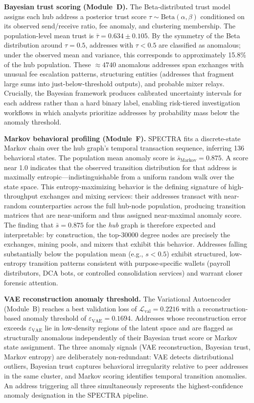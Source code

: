 \textbf{Bayesian trust scoring (Module~D).}
The Beta-distributed trust model assigns each hub address a posterior
trust score $\tau \sim \mathrm{Beta}(\alpha, \beta)$ conditioned on its
observed send/receive ratio, fee anomaly, and clustering membership.
The population-level mean trust is $\bar{\tau} = \num{0.634} \pm \num{0.105}$.
By the symmetry of the Beta distribution around $\tau = 0.5$, addresses
with $\tau < 0.5$ are classified as anomalous; under the observed mean and
variance, this corresponds to approximately \num{15.8}\% of the hub
population.
These $\approx \num{4740}$ anomalous addresses span exchanges with unusual
fee escalation patterns, structuring entities (addresses that fragment large
sums into just-below-threshold outputs), and probable mixer relays.
Crucially, the Bayesian framework produces calibrated uncertainty intervals
for each address rather than a hard binary label, enabling risk-tiered
investigation workflows in which analysts prioritize addresses by
probability mass below the anomaly threshold.

\textbf{Markov behavioral profiling (Module~F).}
SPECTRA fits a discrete-state Markov chain over the hub graph's temporal
transaction sequence, inferring \num{136} behavioral states.
The population mean anomaly score is $\bar{s}_{\text{Markov}} = \num{0.875}$.
A score near \num{1.0} indicates that the observed transition distribution
for that address is maximally entropic---indistinguishable from a
uniform random walk over the state space.
This entropy-maximizing behavior is the defining signature of high-throughput
exchanges and mixing services: their addresses transact with near-random
counterparties across the full hub-node population, producing transition
matrices that are near-uniform and thus assigned near-maximal anomaly score.
The finding that $\bar{s} = \num{0.875}$ for the \emph{hub} graph is
therefore expected and interpretable: by construction, the top-\num{30000}
degree nodes are precisely the exchanges, mining pools, and mixers that
exhibit this behavior.
Addresses falling substantially below the population mean (e.g.,
$s < 0.5$) exhibit structured, low-entropy transition patterns consistent
with purpose-specific wallets (payroll distributors, DCA bots, or
controlled consolidation services) and warrant closer forensic attention.

\textbf{VAE reconstruction anomaly threshold.}
The Variational Autoencoder (Module~B) reaches a best validation loss of
$\mathcal{L}_{\text{val}} = \num{0.2216}$ with a reconstruction-based
anomaly threshold of $\varepsilon_{\text{VAE}} = \num{0.1694}$.
Addresses whose reconstruction error exceeds $\varepsilon_{\text{VAE}}$
lie in low-density regions of the latent space and are flagged as
structurally anomalous independently of their Bayesian trust score or
Markov state assignment.
The three anomaly signals (VAE reconstruction, Bayesian trust, Markov
entropy) are deliberately non-redundant: VAE detects distributional
outliers, Bayesian trust captures behavioral irregularity relative to
peer addresses in the same cluster, and Markov scoring identifies
temporal transition anomalies.
An address triggering all three simultaneously represents the
highest-confidence anomaly designation in the SPECTRA pipeline.

